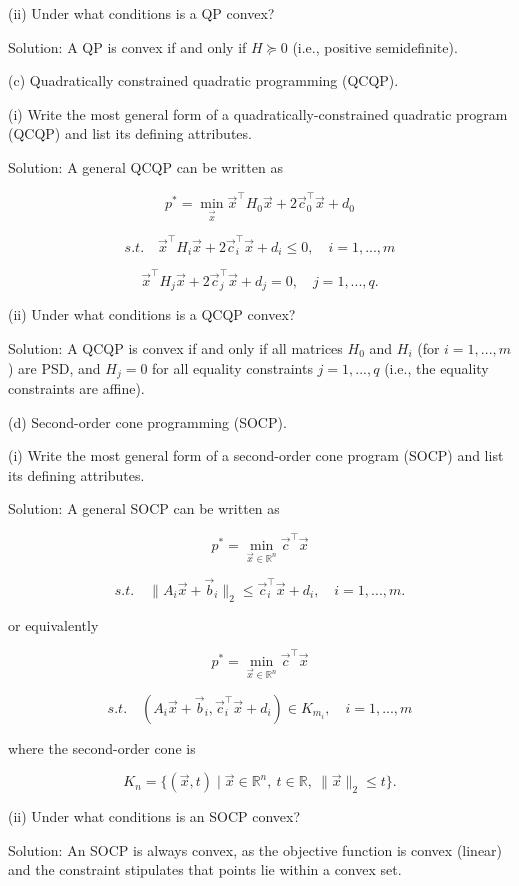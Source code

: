 \documentclass[
	12pt,
]{fphw}
\begin{document}
(ii) Under what conditions is a QP convex?

Solution: A QP is convex if and only if \(H \succeq 0\) (i.e., positive semidefinite).

\vspace{30pt}
(c) Quadratically constrained quadratic programming (QCQP).

(i) Write the most general form of a quadratically-constrained quadratic program (QCQP) and list its defining attributes.

Solution: A general QCQP can be written as

\[
p^* = \min_{\vec{x}} \vec{x}^\top H_0 \vec{x} + 2\vec{c}_0^\top \vec{x} + d_0
\]

\[
s.t. \quad \vec{x}^\top H_i \vec{x} + 2\vec{c}_i^\top \vec{x} + d_i \le 0, \quad i = 1, ..., m
\]

\[
\vec{x}^\top H_j \vec{x} + 2\vec{c}_j^\top \vec{x} + d_j = 0, \quad j = 1, ..., q.
\]

(ii) Under what conditions is a QCQP convex?

Solution: A QCQP is convex if and only if all matrices \(H_0\) and \(H_i\) (for \(i = 1,...,m\)) are PSD, and \(H_j = 0\) for all equality constraints \(j = 1,...,q\) (i.e., the equality constraints are affine).


\vspace{30pt}
(d) Second-order cone programming (SOCP).

(i) Write the most general form of a second-order cone program (SOCP) and list its defining attributes.

Solution: A general SOCP can be written as

\[
p^* = \min_{\vec{x} \in \mathbb{R}^n} \vec{c}^\top \vec{x}
\]

\[
s.t. \quad \|A_i \vec{x} + \vec{b}_i\|_2 \le \vec{c}_i^\top \vec{x} + d_i, \quad i = 1,...,m.
\]

or equivalently

\[
p^* = \min_{\vec{x} \in \mathbb{R}^n} \vec{c}^\top \vec{x}
\]

\[
s.t. \quad (A_i \vec{x} + \vec{b}_i, \vec{c}_i^\top \vec{x} + d_i) \in K_{m_i}, \quad i = 1,...,m
\]

where the second-order cone is

\[
K_n = \{(\vec{x}, t) \mid \vec{x} \in \mathbb{R}^n, \ t \in \mathbb{R}, \ \|\vec{x}\|_2 \le t\}.
\]

(ii) Under what conditions is an SOCP convex?

Solution: An SOCP is always convex, as the objective function is convex (linear) and the constraint stipulates that points lie within a convex set.
\end{document}
